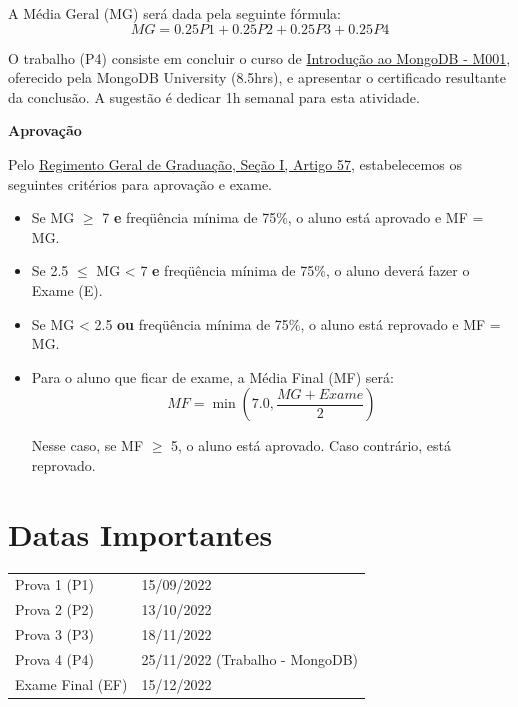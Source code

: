 \documentclass[paper=letter, fontsize=12pt]{scrartcl} %
\begin{document}
\vspace{10pt}

A Média Geral (MG) será dada pela seguinte fórmula:
\[MG = 0.25 P1 + 0.25 P2 + 0.25 P3 + 0.25 P4\]

O trabalho (P4) consiste em concluir o curso de \href{https://university.mongodb.com/courses/M001/about}{Introdução ao MongoDB - M001}, oferecido pela MongoDB
University (8.5hrs), e apresentar o certificado resultante da conclusão. A sugestão é dedicar 1h semanal para esta atividade.

\newpage

\textbf{Aprovação}

Pelo \href{https://www.dac.unicamp.br/portal/graduacao/regimento-geral}{{\color{blue} Regimento Geral de Graduação, Seção I, Artigo 57}}, estabelecemos os seguintes critérios para aprovação e exame.

\begin{itemize}
\item Se MG $\geq$ 7 \textbf{e} freqüência mínima de 75\%, o aluno está aprovado e MF = MG.

\item Se 2.5 $\leq$ MG < 7 \textbf{e} freqüência mínima de 75\%, o aluno deverá fazer o Exame (E).

\item Se MG < 2.5 \textbf{ou} freqüência mínima de 75\%, o aluno está reprovado e MF = MG.

\item Para o aluno que ficar de exame, a Média Final (MF) será:
$$MF = \min\left(7.0, \frac{MG + Exame}{2}\right)$$

Nesse caso, se MF $\geq$ 5, o aluno está aprovado. Caso contrário, está reprovado.


\end{itemize}

\section{Datas Importantes}

\begin{tabular}{ll}
Prova 1 (P1) & 15/09/2022 \\
Prova 2 (P2) & 13/10/2022 \\
Prova 3 (P3) & 18/11/2022 \\
Prova 4 (P4) & 25/11/2022 (Trabalho - MongoDB) \\
Exame Final (EF) & 15/12/2022 \\
\end{tabular}
\end{document}
